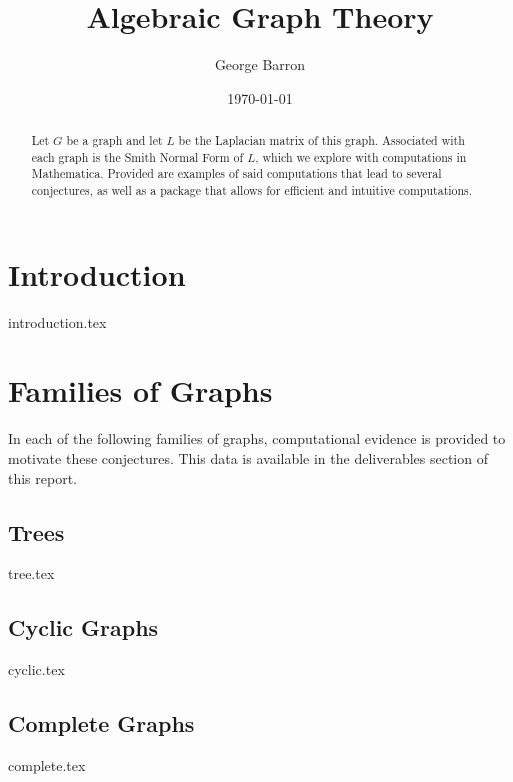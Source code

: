 \documentclass{amsart}
\begin{document}
\title{Algebraic Graph Theory}

\author{George Barron}

\date{\today}


\begin{abstract}
    Let $G$ be a graph and let $L$ be the Laplacian matrix of this graph. Associated with each graph is the Smith Normal Form of $L$, which we explore with computations in Mathematica. Provided are examples of said computations that lead to several conjectures, as well as a package that allows for efficient and intuitive computations.
\end{abstract}

\maketitle

\section{Introduction}

    {introduction.tex}
    
\section{Families of Graphs}
    
    In each of the following families of graphs, computational evidence is provided to motivate these conjectures. This data is available in the deliverables section of this report.
    
    \subsection{Trees}
        {tree.tex}
        
    \subsection{Cyclic Graphs}
        {cyclic.tex}
        
    \subsection{Complete Graphs}
        {complete.tex}
        
\end{document}
